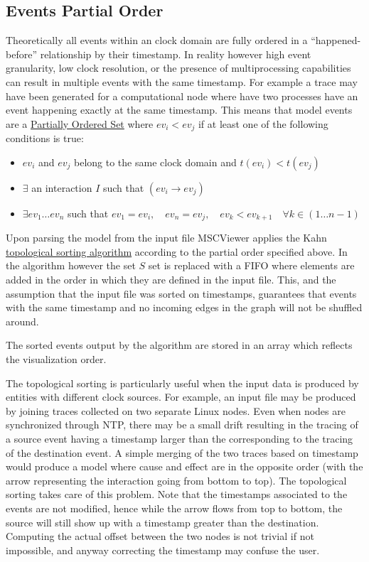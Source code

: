\documentclass[11pt, twoside, titlepage]{book}
\begin{document}
\subsection{Events Partial Order}
\label{events-partial-order}
Theoretically all events within an clock domain are fully ordered in a
``happened-before'' relationship by their timestamp. In reality however high
event granularity, low clock resolution, or the presence of multiprocessing capabilities can result in
multiple events with the same timestamp. For example a trace may
have been generated for a computational node where have two processes have an
event happening exactly at the same timestamp. This means that model events are
a \href{http://en.wikipedia.org/wiki/Partially_ordered_set}{Partially Ordered
Set} where $ev_i < ev_j$ if at least one of the following conditions is true:

\begin{itemize}
  \item $ev_i$ and $ev_j$ belong to the same clock domain and $t(ev_i) <
   t(ev_j)$
   \item  $\exists$ an interaction $I$ such that $(ev_i \rightarrow ev_j)$ 
   \item $\exists ev_1\ldots ev_n$ such that $ev_1=ev_i,\quad ev_n=ev_j,\quad
   ev_k<ev_{k+1} \quad \forall k \in (1 \ldots n-1)$
\end{itemize}

Upon parsing the model from the input file MSCViewer applies the Kahn 
\href{http://en.wikipedia.org/wiki/Topological_sorting}{topological sorting
algorithm} according to the partial order specified above. In the algorithm
however the set $S$ set is replaced with a FIFO where elements are added in the
order in which they are defined in the input file. This, and the assumption that
the input file was sorted on timestamps, guarantees that events with the same
timestamp and no incoming edges in the graph will not be shuffled around. 

The sorted events output by the algorithm are stored in an array which reflects
the visualization order.

The topological sorting is particularly useful when the input data is produced
by entities with different clock sources. For example, an input file may be
produced by joining traces collected on two separate Linux nodes. Even when
nodes are synchronized through NTP, there may be a small drift resulting in the
tracing of a source event having a timestamp larger than the corresponding to
the tracing of the destination event. A simple merging of the two traces based
on timestamp would produce a model where cause and effect are in the opposite
order (with the arrow representing the interaction going from bottom to top).
The topological sorting takes care of this problem. Note that the timestamps
associated to the events are not modified, hence while the arrow flows from top
to bottom, the source will still show up with a timestamp greater than the
destination. Computing the actual offset between the two nodes is not trivial
if not impossible, and anyway correcting the timestamp may confuse the user. 
\end{document}
